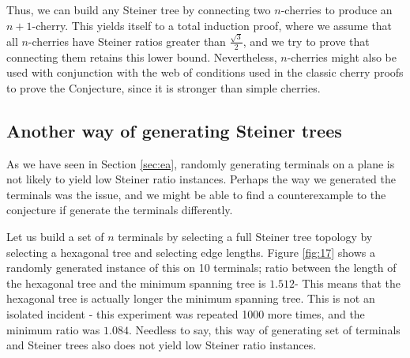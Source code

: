 \documentclass{mpaper}
\begin{document}
Thus, we can build any Steiner tree by connecting two $n$-cherries to produce an $n+1$-cherry. This yields itself to a total induction proof, where we assume that all $n$-cherries have Steiner ratios greater than $\frac{\sqrt{3}}{2}$, and we try to prove that connecting them retains this lower bound. Nevertheless, $n$-cherries might also be used with conjunction with the web of conditions used in the classic cherry proofs to prove the Conjecture, since it is stronger than simple  cherries.

\subsection{Another way of generating Steiner trees}
As we have seen in Section \ref{sec:ea}, randomly generating terminals on a plane is not likely to yield low Steiner ratio instances. Perhaps the way we generated the terminals was the issue, and we might be able to find a counterexample to the conjecture if generate the terminals differently.


Let us build a set of $n$ terminals by selecting a full Steiner tree topology by selecting a hexagonal tree and selecting edge lengths. Figure \ref{fig:17} shows a randomly generated instance of this on 10 terminals; ratio between the length of the hexagonal tree and the minimum spanning tree is $1.512$- This means that the hexagonal tree is actually longer the minimum spanning tree. This is not an isolated incident - this experiment was repeated 1000 more times, and the minimum ratio was $1.084$. Needless to say, this way of generating set of terminals and Steiner trees also does not yield low Steiner ratio instances.
\end{document}
